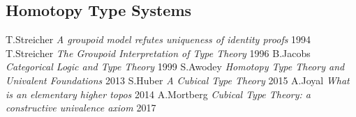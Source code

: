 \documentclass[11pt,oneside]{article}
\begin{document}
\begin{thebibliography}{9}
\subsection*{Homotopy Type Systems}
 T.Streicher \textit{A groupoid model refutes uniqueness of identity proofs} 1994
  T.Streicher \textit{The Groupoid Interpretation of Type Theory} 1996
    B.Jacobs \textit{Categorical Logic and Type Theory} 1999
     S.Awodey \textit{Homotopy Type Theory and Univalent Foundations} 2013
      S.Huber \textit{A Cubical Type Theory} 2015
      A.Joyal \textit{What is an elementary higher topos} 2014
   A.Mortberg \textit{Cubical Type Theory: a constructive univalence axiom} 2017

\end{thebibliography}
\newpage
\end{document}
